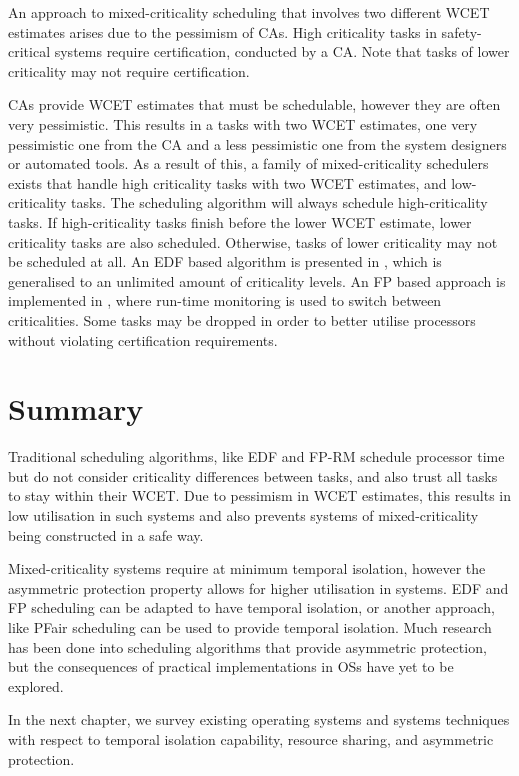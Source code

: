 An approach to mixed-criticality scheduling that involves two different WCET estimates arises due to the pessimism of \glspl{CA}.
High criticality tasks in safety-critical systems require certification, conducted by a \gls{CA}.
Note that tasks of lower criticality may not require certification.

\Glspl{CA} provide {\gls{WCET}} estimates that must be schedulable, however they are often very pessimistic.
This results in a tasks with two {\gls{WCET}} estimates, one very pessimistic one from the \gls{CA} and a less pessimistic one from the system designers or automated tools.
As a result of this, a family of mixed-criticality schedulers exists that handle high criticality tasks with two {\gls{WCET}} estimates, and low-criticality tasks.
The scheduling algorithm will always schedule high-criticality tasks.
If high-criticality tasks finish before the lower \gls{WCET} estimate, lower criticality tasks are also scheduled.
Otherwise, tasks of lower criticality may not be scheduled at all.
An \gls{EDF} based algorithm is presented in \citet{Baruah_BDMVS_11}, which is generalised to an unlimited amount of criticality levels.
An \gls{FP} based approach is implemented in \citet{Pathan:phd}, where run-time monitoring is used to switch between criticalities.
Some tasks may be dropped in order to better utilise processors without violating certification requirements.


\section{Summary}


Traditional scheduling algorithms, like \gls{EDF} and \gls{FP}-\gls{RM} schedule processor time but do not consider criticality differences between tasks, and also trust all tasks to stay within their \gls{WCET}.
Due to pessimism in \gls{WCET} estimates, this results in low utilisation in such systems and also prevents systems of mixed-criticality being constructed in a safe way.

Mixed-criticality systems require at minimum temporal isolation, however the asymmetric protection property allows for higher utilisation in systems.
\gls{EDF} and \gls{FP} scheduling can be adapted to have temporal isolation, or another approach, like PFair scheduling can be used to provide temporal isolation.
Much research has been done into scheduling algorithms that provide asymmetric protection, but the consequences of practical implementations in \glspl{OS} have yet to be explored.

In the next chapter, we survey existing operating systems and systems techniques with respect to temporal isolation capability, resource sharing, and asymmetric protection.

